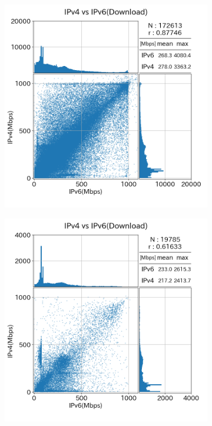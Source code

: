 \begin{figure}[htbp]
\begin{center}
\begin{subfigure}[b]{0.49\textwidth}
            \label{old_diffISP_dl}
        \end{subfigure}
        \caption{{\bf 期間(1)}におけるダウンロードのスループット}
        \label{fig:old_isp_dl}
    
        \begin{subfigure}[b]{0.49\textwidth}
            \centering
            \includegraphics[width=1.0\textwidth]{fig/new_sameISP_dl.png}
            \label{new_sameISP_dl}
        \end{subfigure}
        \begin{subfigure}[b]{0.49\textwidth}
            \centering
            \includegraphics[width=1.0\textwidth]{fig/new_diffISP_dl.png}

\end{subfigure}
\end{center}
\end{figure}

